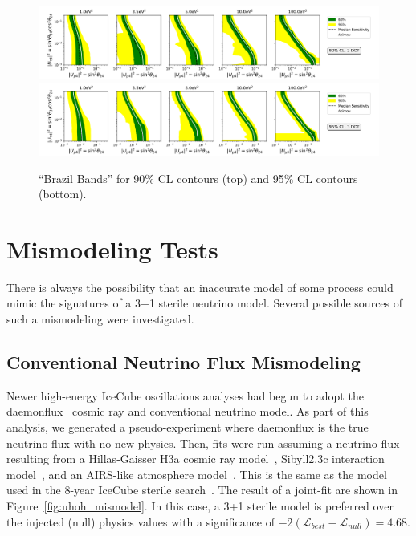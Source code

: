 \documentclass[main.tex]{subfiles}
\begin{document}
\begin{figure}
    \centering
    \includegraphics[width=0.95\linewidth]{figures/median_sense_cl0.9.png}\\
    \includegraphics[width=0.95\linewidth]{figures/median_sense_cl0.95.png}
    \caption{``Brazil Bands'' for 90\% CL contours (top) and 95\% CL contours (bottom).}\label{fig:brazil}
\end{figure}

\section{Mismodeling Tests}

There is always the possibility that an inaccurate model of some process could mimic the signatures of a 3+1 sterile neutrino model. 
Several possible sources of such a mismodeling were investigated. 

\subsection{Conventional Neutrino Flux Mismodeling}

Newer high-energy IceCube oscillations analyses had begun to adopt the daemonflux~\cite{yanez2023daemonflux} cosmic ray and conventional neutrino model. 
As part of this analysis, we generated a pseudo-experiment where daemonflux is the true neutrino flux with no new physics. 
Then, fits were run assuming a neutrino flux resulting from a Hillas-Gaisser H3a cosmic ray model~\cite{GAISSER2012801}, Sibyll2.3c interaction model~\cite{Riehn:2017mfm}, and an AIRS-like atmosphere model~\cite{airs_ref}. 
This is the same as the model used in the 8-year IceCube sterile search~\cite{Aartsen_2020, Aartsen_2020_prd}. 
The result of a joint-fit are shown in Figure~\ref{fig:uhoh_mismodel}.
In this case, a 3+1 sterile model is preferred over the injected (null) physics values with a significance of $-2(\mathcal{L}_{best}-\mathcal{L}_{null})=4.68$. 
\end{document}
